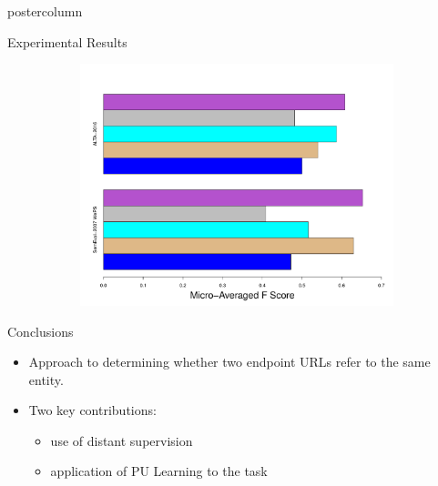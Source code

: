 \documentclass{beamer}
\begin{document}
\begin{frame}
\begin{columns}
\begin{column}{.5\textwidth}
\begin{beamercolorbox}[center]{postercolumn}
\begin{minipage}{.98\textwidth}
{\begin{block}{Experimental Results}
\begin{figure}
        \begin{figure}
							\begin{minipage}{1.22\textwidth}
								\centering\includegraphics[height=0.4\textwidth,width=1.25\textwidth,keepaspectratio]{img/ResultsWWW3.pdf}
							\end{minipage}
						\end{figure}
              \end{figure}
  
            \end{block}
         
            \begin{block}{Conclusions}
              \begin{itemize}
              \item Approach to determining whether two endpoint URLs refer to the same entity.
              \item Two key contributions:
                \begin{itemize}
                \item  use of distant supervision
                \item  application of PU Learning to the task
                \end{itemize}
              \end{itemize}
	\vspace{0.5em}
            \end{block}
		}\end{minipage}\end{beamercolorbox}
	\end{column}
\end{columns}
\end{frame}
\end{document}
